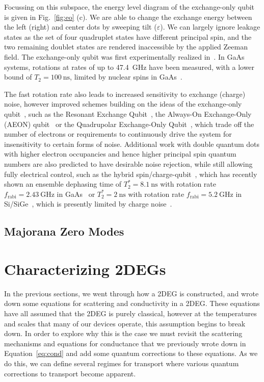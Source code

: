 Focussing on this subspace, the energy level diagram of the exchange-only qubit is given in Fig.~\ref{fig:eo} (c). We are able to change the exchange
energy between the left (right) and center dots by sweeping tilt ($\varepsilon$). We can largely ignore leakage states as the set of four quadruplet
states have different principal spin, and the two remaining doublet states are rendered inaccessible by the applied Zeeman field. The exchange-only
qubit was first experimentally realized in~\cite{PhysRevB.82.075403}. In GaAs systems, rotations at rates of up to \SI{47.4}{\giga\hertz} have been measured,
with a lower bound of $T_2 = \SI{100}{\nano\second}$, limited by nuclear spins in GaAs~\cite{nnano.2013.168}.

The fast rotation rate also leads to increased sensitivity to exchange (charge) noise, however improved schemes building
on the ideas of the exchange-only qubit~\cite{Russ_2017}, such as the Resonant Exchange Qubit~\cite{PhysRevLett.111.050501},
the Always-On Exchange-Only (AEON) qubit~\cite{PhysRevB.93.121410} or the Quadrupolar Exchange-Only Qubit~\cite{PhysRevLett.121.177701,Kornich_2018},
which trade off the number of electrons or requirements to continuously drive the system for insensitivity to certain forms of noise.
Additional work with double quantum dots with higher electron occupancies and hence higher principal spin quantum numbers are also
predicted to have desirable noise rejection, while still allowing fully electrical control, such as the hybrid
spin/charge-qubit~\cite{PhysRevLett.108.140503}, which has recently shown an ensemble dephasing time
of $T_2^* = \SI{8.1}{\nano\second}$ with rotation rate $f_{\textrm{rabi}} = \SI{2.43}{\giga\hertz}$ in
GaAs~\cite{PhysRevLett.116.086801} or $T_2^* = \SI{2}{\nano\second}$ with rotation rate $f_{\textrm{rabi}} = \SI{5.2}{\giga\hertz}$ in
Si/SiGe~\cite{nature13407}, which is presently limited by charge noise~\cite{s41534-017-0034-2}.

\clearpage

\subsection{Majorana Zero Modes}
\label{sec:majo}


\section{Characterizing 2DEGs}
\label{sec:char}
In the previous sections, we went through how a 2DEG is constructed, and wrote down some equations for scattering
and conductivity in a 2DEG. These equations have all assumed that the 2DEG is purely classical, however at the temperatures
and scales that many of our devices operate, this assumption begins to break down. In order to explore why this is the case
we must revisit the scattering mechanisms and equations for conductance that we previously wrote down in Equation~\ref{eq:cond}
and add some quantum corrections to these equations. As we do this, we can define several regimes for transport
where various quantum corrections to transport become apparent.

